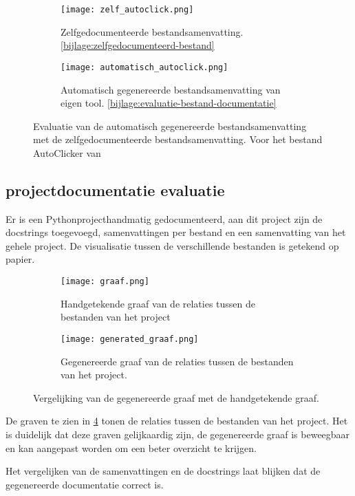 \begin{figure}
    \centering
    \begin{subfigure}[b]{1\textwidth}
        \centering
        \texttt{[image: zelf\_autoclick.png]}
        \caption{Zelfgedocumenteerde bestandsamenvatting. \ref{bijlage:zelfgedocumenteerd-bestand}}
        \label{fig:zelfgedocumenteerd-bestandsamenvatting}
    \end{subfigure}
    \hfill
    \begin{subfigure}[b]{1\textwidth}
        \centering
        \texttt{[image: automatisch\_autoclick.png]}
        \caption{Automatisch gegenereerde bestandsamenvatting van eigen tool. \ref{bijlage:evaluatie-bestand-documentatie}}
        \label{fig:automatisch-bestandsamenvatting}
    \end{subfigure}
    \caption{Evaluatie van de automatisch gegenereerde bestandsamenvatting met de zelfgedocumenteerde bestandsamenvatting. Voor het bestand AutoClicker van \textcite{Waegeneer2022}}
    \label{fig:evaluatie-bestand-documentatie}
\end{figure}


\subsection{projectdocumentatie evaluatie}
\label{sec:project-documentatie-evaluatie-project}

Er is een Pythonprojecthandmatig gedocumenteerd, aan dit project zijn de docstrings toegevoegd, samenvattingen per bestand en een samenvatting van het gehele project.
De visualisatie tussen de verschillende bestanden is getekend op papier.

\begin{figure}
    \centering
    \begin{subfigure}[b]{1\textwidth}
        \centering
        \texttt{[image: graaf.png]}
        \caption{Handgetekende graaf van de relaties tussen de bestanden van het project \autocite{Simmons2019}}
    \end{subfigure}
    \hfill
    \begin{subfigure}[b]{0.5\textwidth}
        \centering
        \texttt{[image: generated\_graaf.png]}
        \caption{Gegenereerde graaf van de relaties tussen de bestanden van het project. \autocite{Simmons2019}}
    \end{subfigure}
    \caption{Vergelijking van de gegenereerde graaf met de handgetekende graaf.}
    \label{fig:evaluatie-graaf}
\end{figure}

De graven te zien in \ref{fig:evaluatie-graaf} tonen de relaties tussen de bestanden van het project. 
Het is duidelijk dat deze graven gelijkaardig zijn, de gegenereerde graaf is beweegbaar en kan aangepast worden om een beter overzicht te krijgen.

Het vergelijken van de samenvattingen en de docstrings laat blijken dat de gegenereerde documentatie correct is.

